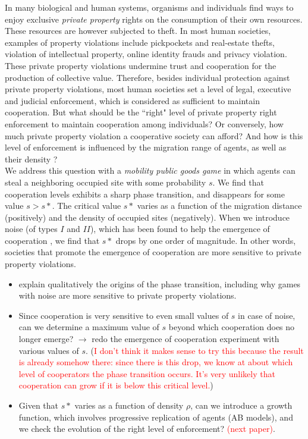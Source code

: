 In many biological and human systems, organisms and individuals find ways to enjoy exclusive {\it private property} rights on the consumption of their own resources. These resources are however subjected to theft. In most human societies, examples of property violations include pickpockets and real-estate thefts, violation of intellectual property, online identity frauds and privacy violation. These private property violations undermine trust and cooperation for the production of collective value. Therefore, besides individual protection against private property violations, most human societies set a level of legal, executive and judicial enforcement, which is considered as sufficient to maintain cooperation. But what should be the ``right" level of private property right enforcement to maintain cooperation among individuals? Or conversely, how much private property violation a cooperative society can afford? And how is this level of enforcement is influenced by the migration range of agents, as well as their density ?\\

\noindent We address this question with a {\it mobility public goods game} in which agents can steal a neighboring occupied site with some probability $s$. We find that cooperation levels exhibits a sharp phase transition, and disappears for some value $s > s*$. The critical value $s*$ varies as a function of the migration distance (positively) and the density of occupied sites (negatively). When we introduce noise (of types $I$ and $II$), which has been found to help the emergence of cooperation \cite{}, we find that $s*$ drops by one order of magnitude. In other words, societies that promote the emergence of cooperation are more sensitive to private property violations.\\


\begin{itemize}
  \item explain qualitatively the origins of the phase transition, including why games with noise are more sensitive to private property violations.
  \item Since cooperation is very sensitive to even small values of $s$ in case of noise, can we determine a maximum value of $s$ beyond which cooperation does no longer emerge? $\rightarrow$ redo the emergence of cooperation experiment with various values of $s$. (\textcolor{red}{I don't think it makes sense to try this because the result is already somehow there: since there is this drop, we know at about which level of cooperators the phase transition occurs. It's very unlikely that cooperation can grow if it is below this critical level.})
  \item Given that $s*$ varies as a function of density $\rho$, can we introduce a growth function, which involves progressive replication of agents (AB models), and we check the evolution of the right level of enforcement? \textcolor{red}{(next paper)}.
\end{itemize}

